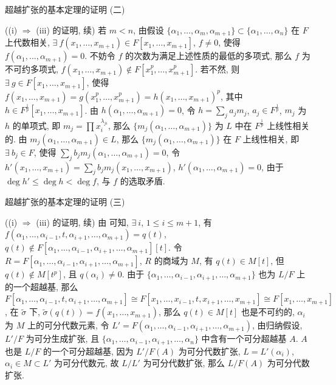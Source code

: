 
\begin{frame}{超越扩张的基本定理的证明 (二)}

\startproof[bg=yellow, fg=red]((i) $\Longrightarrow$ (iii) 的证明, 续)
若 $m < n$, 由假设 $\{ \alpha_1, \dots, \alpha_m, \alpha_{m+1} \}
\subset \{ \alpha_1, \dots, \alpha_n \}$ 在 $F$ 上代数相关,
$\exists\ f(x_1, \dots, x_{m+1}) \in F[x_1, \dots, x_{m+1}]$, $f \neq 0$,
使得 $f(\alpha_1, \dots, \alpha_{m+1}) = 0$.
不妨令 $f$ 的次数为满足上述性质的最低的多项式, 那么 $f$ 为不可约多项式,
 $f(x_1, \dots, x_{m+1}) \notin F[x_1^p, \dots, x_{m+1}^p]$.
若不然, 则 $\exists\ g \in F[x_1, \dots, x_{m+1}]$,
使得 $f(x_1, \dots, x_{m+1}) = g(x_1^p, \dots, x_{m+1}^p)
= h(x_1, \dots, x_{m+1})^p$, 其中 $h \in F^{\frac{1}{p}}[x_1, \dots, x_{m+1}]$.
由 $h(\alpha_1, \dots, \alpha_{m+1}) = 0$, 令 $h = \sum_j a_j m_j$,
$a_j \in F^{\frac{1}{p}}$, $m_j$ 为 $h$ 的单项式, 即 $m_j = \prod x_i^{\lambda_{ji}}$,
那么 $\{ m_j(\alpha_1, \dots, \alpha_{m+1}) \}$ 为 $L$ 中在 $F^{\frac{1}{p}}$
上线性相关的.
由 $m_j(\alpha_1, \dots, \alpha_{m+1}) \in L$,
那么 $\{ m_j(\alpha_1, \dots, \alpha_{m+1}) \}$ 在 $F$ 上线性相关,
即 $\exists\ b_j \in F$, 使得 $\sum_j b_j m_j(\alpha_1, \dots, \alpha_{m+1}) = 0$,
令 $h'(x_1, \dots, x_{m+1}) = \sum_j b_j m_j(x_1, \dots, x_{m+1})$,
$h'(\alpha_1, \dots, \alpha_{m+1}) = 0$, 由于 $\deg h' \leq \deg h < \deg f$,
与 $f$ 的选取矛盾.

\end{frame}


\begin{frame}{超越扩张的基本定理的证明 (三)}

\startproof[bg=yellow, fg=red]((i) $\Longrightarrow$ (iii) 的证明, 续)
由  可知, $\exists\ i$, $1 \leq i \leq m+1$, 有
$f(\alpha_1, \dots, \alpha_{i-1}, t, \alpha_{i+1}, \dots, \alpha_{m+1}) = q(t)$,
$q(t) \notin F[\alpha_1, \dots, \alpha_{i-1}, \alpha_{i+1}, \dots, \alpha_{m+1}][t]$.
令 $R = F[\alpha_1, \dots, \alpha_{i-1}, \alpha_{i+1}, \dots, \alpha_{m+1}]$,
$R$ 的商域为 $M$,
有 $q(t) \in M[t]$, 但 $q(t) \notin M[t^p]$, 且 $q(\alpha_i) \neq 0$.
由于 $\{ \alpha_1, \dots, \alpha_{i-1}, \alpha_{i+1}, \dots, \alpha_{m+1} \}$
也为 $L/F$ 上的一个超越基,
那么 $F[\alpha_1, \dots, \alpha_{i-1}, t, \alpha_{i+1}, \dots, \alpha_{m+1}]
\cong F[x_1, \dots, x_{i-1}, t, x_{i+1}, \dots, x_{m+1}]
\cong F[x_1, \dots, x_{m+1}]$,
在 $\tilde{\sigma}$ 下, $\tilde{\sigma}(q(t)) = f(x_1, \dots, x_{m+1})$,
那么 $q(t) \in M[t]$ 也是不可约的,
$\alpha_i$ 为 $M$ 上的可分代数元素,
令 $L' = F(\alpha_1, \dots, \alpha_{i-1}, \alpha_{i+1}, \dots, \alpha_{m+1})$,
由归纳假设, $L'/F$ 为可分生成扩张,
且 $\{ \alpha_1, \dots, \alpha_{i-1}, \alpha_{i+1}, \dots, \alpha_n \}$
中含有一个可分超越基 $A$.
$A$ 也是 $L/F$ 的一个可分超越基,
因为 $L'/F(A)$ 为可分代数扩张, $L = L'(\alpha_i)$,
$\alpha_i \in M \subset L'$ 为可分代数元,
故 $L/L'$ 为可分代数扩张, 那么 $L/F(A)$ 为可分代数扩张.

\end{frame}


